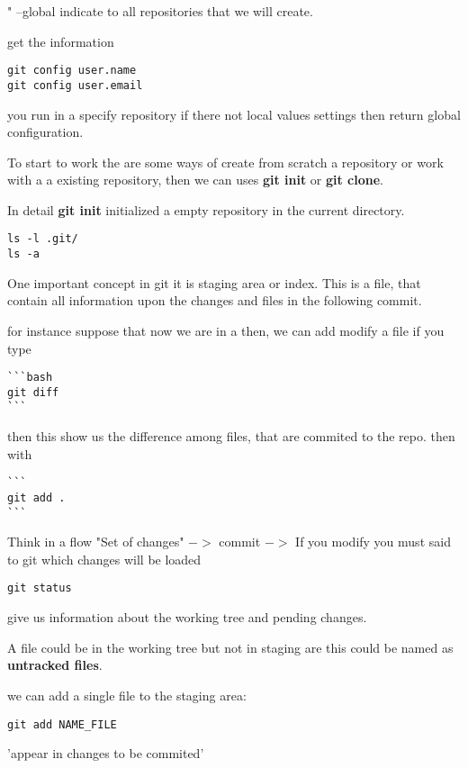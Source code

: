 \documentclass[10pt,a4paper]{article}
\begin{document}
" --global indicate to all repositories that we will create.


get the information 

\begin{verbatim}
git config user.name
git config user.email
\end{verbatim}
you run in a specify repository if there not local values settings then return global configuration.


To start to work the are some ways of create from scratch a repository or work with a a existing repository, then we can uses \textbf{git init} or \textbf{git clone}.

In detail \textbf{git init} initialized a empty repository in the current directory.

\begin{verbatim}
ls -l .git/
ls -a
\end{verbatim}

One important concept in git it is staging area or index. This is a file, that contain all information upon the changes and files in the following commit.

for instance suppose that now we are in a 
then, we can add modify a file if you type 

\begin{verbatim}
```bash
git diff
``` 
\end{verbatim}

then this show us the difference among files, that are commited to the repo.
then with 
\begin{verbatim}
```
git add .
```
\end{verbatim} 

Think in a flow "Set of changes" $->$ commit $->$ 
If you modify you must said to git which changes will be loaded



\begin{verbatim}
git status
\end{verbatim}
give us information about the working tree and pending changes.

A file could be in the working tree but not in staging are this could be named as \textbf{untracked files}.

we can add a single file to the staging area:
\begin{verbatim}
git add NAME_FILE
\end{verbatim}

'appear in changes to be commited'
\end{document}
